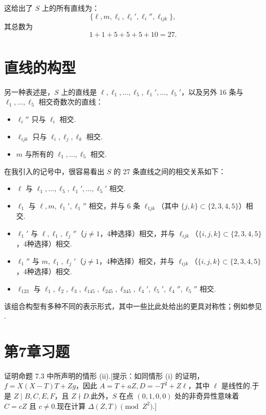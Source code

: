 这给出了 \(S\) 上的所有直线为：
\[
\{\ell, m, \ell_i, \ell_i', \ell_i'', \ell_{ijk}\},
\]
其总数为
\[
1 + 1 + 5 + 5 + 5 + 10 = 27.
\]

\section{直线的构型}

另一种表述是，\(S\) 上的直线是 \(\ell, \ell_1, \dots, \ell_5, \ell_1', \dots, \ell_5'\)，以及另外 16 条与 \(\ell_1, \dots, \ell_5\) 相交奇数次的直线：
\begin{itemize}
    \item \(\ell_i''\) 只与 \(\ell_i\) 相交.
    \item \(\ell_{ijk}\) 只与 \(\ell_i, \ell_j, \ell_k\) 相交.
    \item \(m\) 与所有的 \(\ell_1, \dots, \ell_5\) 相交.
\end{itemize}
在我引入的记号中，很容易看出 \(S\) 的 27 条直线之间的相交关系如下：
\begin{itemize}
    \item \(\ell\) 与 \(\ell_1, \dots, \ell_5, \ell_1', \dots, \ell_5'\) 相交.
    \item \(\ell_1\) 与 \(\ell, m, \ell_1', \ell_1''\) 相交，并与 6 条 \(\ell_{1jk}\)（其中 \(\{j,k\} \subset \{2,3,4,5\}\)）相交.
    \item \(\ell_1'\) 与 \(\ell, \ell_1, \ell_j''\)（\(j \neq 1\)，4种选择）相交，并与 \(\ell_{ijk}\)（\(\{i,j,k\} \subset \{2,3,4,5\}\)，4种选择）相交.
    \item \(\ell_1''\) 与 \(m, \ell_1, \ell_j'\)（\(j \neq 1\)，4种选择）相交，并与 \(\ell_{ijk}\)（\(\{i,j,k\} \subset \{2,3,4,5\}\)，4种选择）相交.
    \item \(\ell_{123}\) 与 \(\ell_1, \ell_2, \ell_3, \ell_{145}, \ell_{245}, \ell_{345}, \ell_4', \ell_5', \ell_4'', \ell_5''\) 相交.
\end{itemize}
该组合构型有多种不同的表示形式，其中一些比此处给出的更具对称性；例如参见 \cite[pp. 122-128, 151-152]{SempleRoth_IntroductionToAlgebraicGeometry}.

\section{第7章习题}

\begin{exercise}
证明命题 7.3 中所声明的情形 (ii).[提示：如同情形 (i) 的证明，\(f = X(X-T)T + Zg\)，因此 \(A = T+aZ, D = -T^2 + Z\ell\)，其中 \(\ell\) 是线性的.于是 \(Z \mid B,C,E,F\)，且 \(Z \nmid D\).此外，\(S\) 在点 \((0,1,0,0)\) 处的非奇异性意味着 \(C=cZ\) 且 \(c \neq 0\).现在计算 \(\Delta(Z,T) \pmod{Z^2}\).]
\end{exercise}


